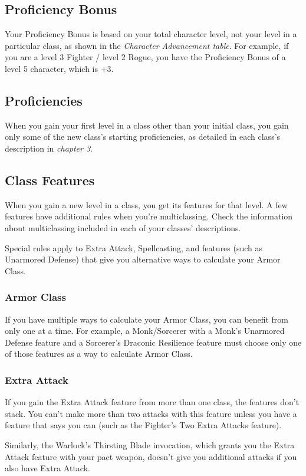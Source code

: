 \documentclass[10pt,a4paper,twoside,bg=print,twocolumn,openany,nodeprecatedcode]{dndbook}
\begin{document}
\subsection{Proficiency Bonus}
Your Proficiency Bonus is based on your total character level, not your level in a particular class, as shown in the \textit{Character Advancement table}. For example, if you are a level 3 Fighter / level 2 Rogue, you have the Proficiency Bonus of a level 5 character, which is +3.

\subsection{Proficiencies}
When you gain your first level in a class other than your initial class, you gain only some of the new class's starting proficiencies, as detailed in each class's description in \textit{chapter 3}.

\subsection{Class Features}
When you gain a new level in a class, you get its features for that level. A few features have additional rules when you're multiclassing. Check the information about multiclassing included in each of your classes' descriptions.

Special rules apply to Extra Attack, Spellcasting, and features (such as Unarmored Defense) that give you alternative ways to calculate your Armor Class.

\subsubsection{Armor Class}
If you have multiple ways to calculate your Armor Class, you can benefit from only one at a time. For example, a Monk/Sorcerer with a Monk's Unarmored Defense feature and a Sorcerer's Draconic Resilience feature must choose only one of those features as a way to calculate Armor Class.

\subsubsection{Extra Attack}
If you gain the Extra Attack feature from more than one class, the features don't stack. You can't make more than two attacks with this feature unless you have a feature that says you can (such as the Fighter's Two Extra Attacks feature).

Similarly, the Warlock's Thirsting Blade invocation, which grants you the Extra Attack feature with your pact weapon, doesn't give you additional attacks if you also have Extra Attack.
\end{document}
